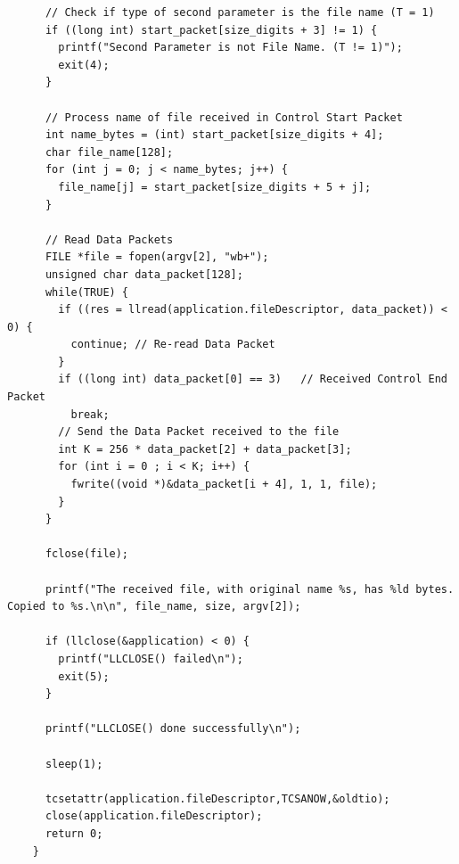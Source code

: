 \documentclass[article, a4paper, 11pt, oneside]{memoir}
\begin{document}
\begin{lstlisting}
	  // Check if type of second parameter is the file name (T = 1)
	  if ((long int) start_packet[size_digits + 3] != 1) {
		printf("Second Parameter is not File Name. (T != 1)");
		exit(4);
	  }
	
	  // Process name of file received in Control Start Packet
	  int name_bytes = (int) start_packet[size_digits + 4];
	  char file_name[128];
	  for (int j = 0; j < name_bytes; j++) {
		file_name[j] = start_packet[size_digits + 5 + j];
	  }
	
	  // Read Data Packets
	  FILE *file = fopen(argv[2], "wb+");
	  unsigned char data_packet[128];
	  while(TRUE) {
		if ((res = llread(application.fileDescriptor, data_packet)) < 0) {
		  continue; // Re-read Data Packet
		}
		if ((long int) data_packet[0] == 3)   // Received Control End Packet
		  break;
		// Send the Data Packet received to the file
		int K = 256 * data_packet[2] + data_packet[3];
		for (int i = 0 ; i < K; i++) {
		  fwrite((void *)&data_packet[i + 4], 1, 1, file);
		}
	  }
	
	  fclose(file);
	
	  printf("The received file, with original name %s, has %ld bytes. Copied to %s.\n\n", file_name, size, argv[2]);
	
	  if (llclose(&application) < 0) {
		printf("LLCLOSE() failed\n");
		exit(5);
	  }
	
	  printf("LLCLOSE() done successfully\n");
	
	  sleep(1);
	
	  tcsetattr(application.fileDescriptor,TCSANOW,&oldtio);
	  close(application.fileDescriptor);
	  return 0;
	}	
\end{lstlisting}

\newpage
\end{document}

